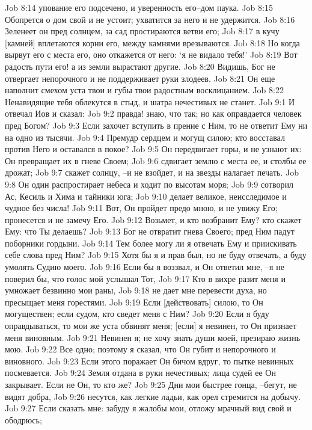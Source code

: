 Job 8:14  упование его подсечено, и уверенность его--дом паука.
Job 8:15  Обопрется о дом свой и не устоит; ухватится за него и не удержится.
Job 8:16  Зеленеет он пред солнцем, за сад простираются ветви его;
Job 8:17  в кучу [камней] вплетаются корни его, между камнями врезываются.
Job 8:18  Но когда вырвут его с места его, оно откажется от него: `я не видало тебя!'
Job 8:19  Вот радость пути его! а из земли вырастают другие.
Job 8:20  Видишь, Бог не отвергает непорочного и не поддерживает руки злодеев.
Job 8:21  Он еще наполнит смехом уста твои и губы твои радостным восклицанием.
Job 8:22  Ненавидящие тебя облекутся в стыд, и шатра нечестивых не станет.
Job 9:1  И отвечал Иов и сказал:
Job 9:2  правда! знаю, что так; но как оправдается человек пред Богом?
Job 9:3  Если захочет вступить в прение с Ним, то не ответит Ему ни на одно из тысячи.
Job 9:4  Премудр сердцем и могущ силою; кто восставал против Него и оставался в покое?
Job 9:5  Он передвигает горы, и не узнают их: Он превращает их в гневе Своем;
Job 9:6  сдвигает землю с места ее, и столбы ее дрожат;
Job 9:7  скажет солнцу, --и не взойдет, и на звезды налагает печать.
Job 9:8  Он один распростирает небеса и ходит по высотам моря;
Job 9:9  сотворил Ас, Кесиль и Хима и тайники юга;
Job 9:10  делает великое, неисследимое и чудное без числа!
Job 9:11  Вот, Он пройдет предо мною, и не увижу Его; пронесется и не замечу Его.
Job 9:12  Возьмет, и кто возбранит Ему? кто скажет Ему: что Ты делаешь?
Job 9:13  Бог не отвратит гнева Своего; пред Ним падут поборники гордыни.
Job 9:14  Тем более могу ли я отвечать Ему и приискивать себе слова пред Ним?
Job 9:15  Хотя бы я и прав был, но не буду отвечать, а буду умолять Судию моего.
Job 9:16  Если бы я воззвал, и Он ответил мне, --я не поверил бы, что голос мой услышал Тот,
Job 9:17  Кто в вихре разит меня и умножает безвинно мои раны,
Job 9:18  не дает мне перевести духа, но пресыщает меня горестями.
Job 9:19  Если [действовать] силою, то Он могуществен; если судом, кто сведет меня с Ним?
Job 9:20  Если я буду оправдываться, то мои же уста обвинят меня; [если] я невинен, то Он признает меня виновным.
Job 9:21  Невинен я; не хочу знать души моей, презираю жизнь мою.
Job 9:22  Все одно; поэтому я сказал, что Он губит и непорочного и виновного.
Job 9:23  Если этого поражает Он бичом вдруг, то пытке невинных посмевается.
Job 9:24  Земля отдана в руки нечестивых; лица судей ее Он закрывает. Если не Он, то кто же?
Job 9:25  Дни мои быстрее гонца, --бегут, не видят добра,
Job 9:26  несутся, как легкие ладьи, как орел стремится на добычу.
Job 9:27  Если сказать мне: забуду я жалобы мои, отложу мрачный вид свой и ободрюсь;
